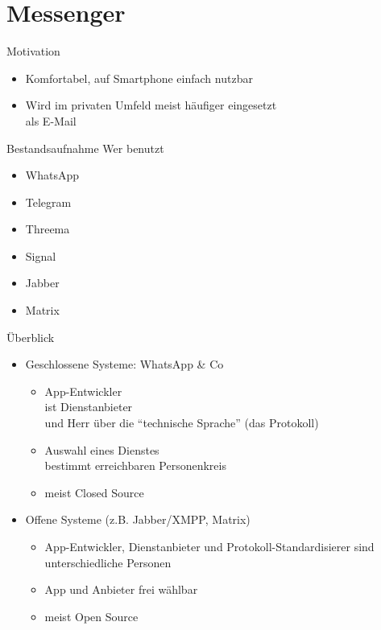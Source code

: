 \section{Messenger}
\begin{frame}{Motivation}
\begin{itemize}
\item Komfortabel, auf Smartphone einfach nutzbar
\item Wird im privaten Umfeld meist häufiger eingesetzt\\ als E-Mail
\end{itemize}

\pause
\begin{block}{Bestandsaufnahme}
Wer benutzt
\begin{itemize}
\item<+-> WhatsApp
\item<+-> Telegram
\item<+-> Threema
\item<+-> Signal
\item<+-> Jabber
\item<+-> Matrix
\end{itemize}
\end{block}
\end{frame}

\begin{frame}{Überblick}
  \begin{itemize}
    \item Geschlossene Systeme: WhatsApp \& Co
      \begin{itemize}
        \item App-Entwickler\\
          ist Dienstanbieter\\
          und Herr über die ``technische Sprache'' (das Protokoll)
        \item Auswahl eines Dienstes\\bestimmt erreichbaren Personenkreis
        \item meist Closed Source
      \end{itemize}
    \item Offene Systeme (z.B. Jabber/XMPP, Matrix)
      \begin{itemize}
        \item App-Entwickler, Dienstanbieter und Protokoll-Standardisierer sind unterschiedliche Personen
        \item App und Anbieter frei wählbar
        \item meist Open Source
      \end{itemize}
  \end{itemize}
\end{frame}

